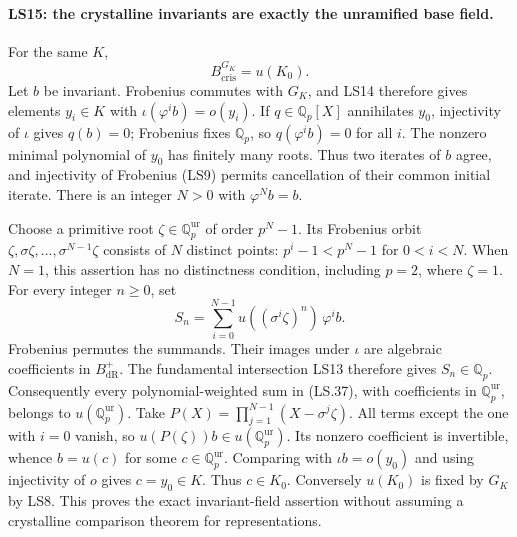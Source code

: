 \paragraph{LS15: the crystalline invariants are exactly the unramified base field.}
For the same $K$,
\[
                         B_{\mathrm{cris}}^{G_K}=u(K_0).
                                                               \tag{LS.36}
\]
Let $b$ be invariant. Frobenius commutes with $G_K$, and LS14
therefore gives elements $y_i\in K$ with
$\iota(\varphi^i b)=o(y_i)$. If $q\in\mathbb Q_p[X]$
annihilates $y_0$, injectivity of $\iota$ gives $q(b)=0$;
Frobenius fixes $\mathbb Q_p$, so $q(\varphi^i b)=0$ for
all $i$. The nonzero minimal polynomial of $y_0$ has finitely
many roots. Thus two iterates of $b$ agree, and injectivity of
Frobenius (LS9) permits cancellation of their common initial
iterate. There is an integer $N>0$ with $\varphi^N b=b$.

Choose a primitive root $\zeta\in\mathbb Q_p^{\mathrm{ur}}$
of order $p^N-1$. Its Frobenius orbit
$\zeta,\sigma\zeta,\ldots,\sigma^{N-1}\zeta$ consists of
$N$ distinct points: $p^i-1<p^N-1$ for $0<i<N$.
When $N=1$, this assertion has no distinctness condition, including
$p=2$, where $\zeta=1$. For every integer $n\ge0$, set
\[
 S_n=\sum_{i=0}^{N-1}u((\sigma^i\zeta)^n)\,\varphi^i b.
                                                               \tag{LS.37}
\]
Frobenius permutes the summands. Their images under $\iota$
are algebraic coefficients in $B_{\mathrm{dR}}^+$.
The fundamental intersection LS13 therefore gives
$S_n\in\mathbb Q_p$. Consequently every polynomial-weighted
sum in (LS.37), with coefficients in
$\mathbb Q_p^{\mathrm{ur}}$, belongs to $u(\mathbb Q_p^{\mathrm{ur}})$.
Take
$P(X)=\prod_{j=1}^{N-1}(X-\sigma^j\zeta)$.
All terms except the one with $i=0$ vanish, so
$u(P(\zeta))b\in u(\mathbb Q_p^{\mathrm{ur}})$.
Its nonzero coefficient is invertible, whence $b=u(c)$ for some
$c\in\mathbb Q_p^{\mathrm{ur}}$. Comparing with
$\iota b=o(y_0)$ and using injectivity of $o$ gives $c=y_0\in K$.
Thus $c\in K_0$. Conversely $u(K_0)$ is fixed by $G_K$ by
LS8. This proves the exact invariant-field assertion without
assuming a crystalline comparison theorem for representations.

